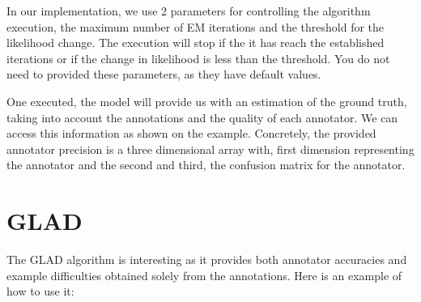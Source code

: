 \documentclass[letterpaper,10pt,english]{sphinxmanual}
\begin{document}
%
\begin{sphinxVerbatim}[commandchars=\\\{\}]
 
 

   

   \PYG{o}{[}\PYG{o}{]}

     

   \PYG{o}{[}\PYG{o}{]}

   
\end{sphinxVerbatim}

In our implementation, we use 2 parameters for controlling the algorithm execution, the maximum number
of EM iterations and the threshold for the likelihood change. The execution will stop if the it has reach
the established iterations or if the change in likelihood is less than the threshold. You do not need to
provided these parameters, as they have default values.

One executed, the model will provide us with an estimation of the ground truth, taking into account the
annotations and the quality of each annotator. We can access this information as shown on the example.
Concretely, the provided annotator precision is a three dimensional array with, first dimension representing
the annotator and the second and third, the confusion matrix for the annotator.


\section{GLAD}
\label{\detokenize{usage/examples:glad}}
The GLAD algorithm is interesting as it provides both annotator accuracies and example difficulties obtained
solely from the annotations. Here is an example of how to use it:
\end{document}

